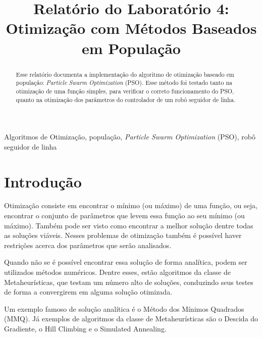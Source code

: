 \documentclass[conference]{IEEEtran}
\begin{document}
\title{Relatório do Laboratório 4: \\ Otimização com Métodos Baseados em População\\
}

\author{
}

\maketitle

\begin{abstract}
Esse relatório documenta a implementação do algoritmo de otimização baseado em população: \textit{Particle Swarm Optimization} (PSO). Esse método foi testado tanto na otimização de uma função simples, para verificar o correto funcionamento do PSO, quanto na otimização dos parâmetros do controlador de um robô seguidor de linha.
\end{abstract}

\begin{IEEEkeywords}
Algoritmos de Otimização, população, \textit{Particle Swarm Optimization} (PSO), robô seguidor de linha
\end{IEEEkeywords}

\section{Introdução}
Otimização consiste em encontrar o mínimo (ou máximo) de uma função, ou seja, encontrar o conjunto de parâmetros que levem essa função ao seu mínimo (ou máximo). Também pode ser visto como encontrar a melhor solução dentre todas as soluções viáveis. Nesses problemas de otimização também é possível haver restrições acerca dos parâmetros que serão analisados.

Quando não se é possível encontrar essa solução de forma analítica, podem ser utilizados métodos numéricos. Dentre esses, estão algoritmos da classe de Metaheurísticas, que testam um número alto de soluções, conduzindo seus testes de forma a convergirem em alguma solução otimizada. 

Um exemplo famoso de solução analítica é o Método dos Mínimos Quadrados (MMQ). Já exemplos de algoritmos da classe de Metaheurísticas são o Descida do Gradiente, o Hill Climbing e o Simulated Annealing. 
\end{document}
